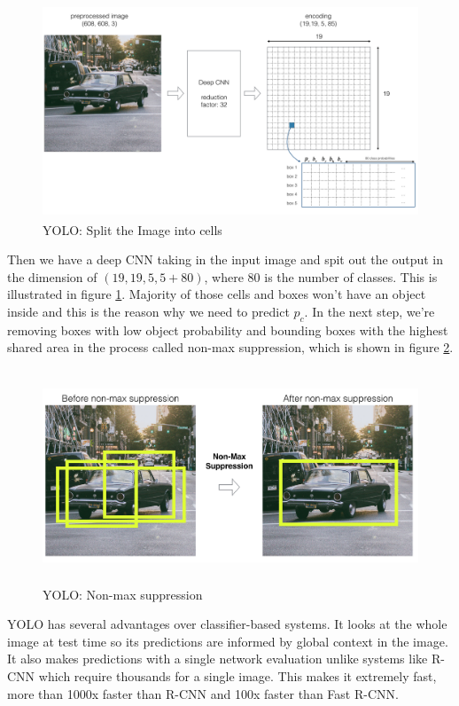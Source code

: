 \documentclass[twoside]{article}
\begin{document}
\begin{figure}[!htb]
\centering
\includegraphics[height=2.5in]{pics/yolo_split.png}
\caption{YOLO: Split the Image into cells}
\label{fig:yolo_split}
\end{figure}
\noindent Then we have a deep CNN taking in the input image and spit out the output in the dimension of $(19, 19, 5, 5 + 80)$, where 80 is the number of classes. This is illustrated in figure \ref{fig:yolo_split}.\newline
Majority of those cells and boxes won’t have an object inside and this is the reason why we need to predict $p_c$. In the next step, we’re removing boxes with low object probability and bounding boxes with the highest shared area in the process called non-max suppression, which is shown in figure \ref{fig:yolo_suppression}.\newline
\begin{figure}[!htb]
\centering
\includegraphics[height=2.5in]{pics/yolo_suppression.png}
\caption{YOLO: Non-max suppression}
\label{fig:yolo_suppression}
\end{figure}
YOLO has several advantages over classifier-based systems. It looks at the whole image at test time so its predictions are informed by global context in the image. It also makes predictions with a single network evaluation unlike systems like R-CNN which require thousands for a single image. This makes it extremely fast, more than 1000x faster than R-CNN and 100x faster than Fast R-CNN.
\end{document}
